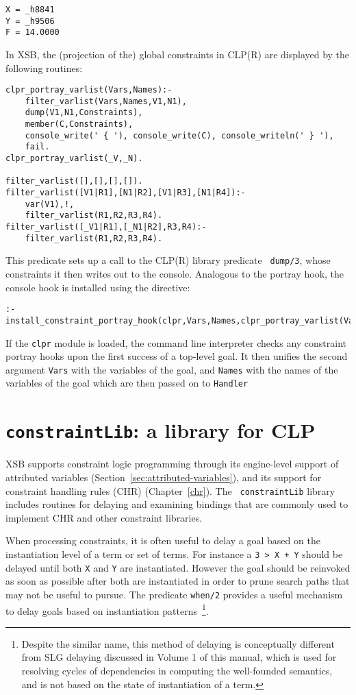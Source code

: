\begin{description}
{\begin{verbatim}
X = _h8841
Y = _h9506
F = 14.0000
\end{verbatim}
}
%
In XSB, the (projection of the) global constraints in CLP(R) are
displayed by the following routines:
%
{\small
\begin{verbatim}
clpr_portray_varlist(Vars,Names):- 
	filter_varlist(Vars,Names,V1,N1),
	dump(V1,N1,Constraints),
	member(C,Constraints),
	console_write(' { '), console_write(C),	console_writeln(' } '),
	fail.
clpr_portray_varlist(_V,_N).

filter_varlist([],[],[],[]).
filter_varlist([V1|R1],[N1|R2],[V1|R3],[N1|R4]):- 
	var(V1),!,
	filter_varlist(R1,R2,R3,R4).
filter_varlist([_V1|R1],[_N1|R2],R3,R4):- 
	filter_varlist(R1,R2,R3,R4).
\end{verbatim}
}
%
This predicate sets up a call to the CLP(R) library predicate {\tt
  dump/3}, whose constraints it then writes out to the console.
Analogous to the portray hook, the console hook is installed using the
directive:
%
{\small
\begin{verbatim}
:- install_constraint_portray_hook(clpr,Vars,Names,clpr_portray_varlist(Vars,Names)).
\end{verbatim}
}
%
If the {\tt clpr} module is loaded, the command line interpreter
checks any constraint portray hooks upon the first success of a
top-level goal.  It then unifies the second argument {\tt Vars} with
the variables of the goal, and {\tt Names} with the names of the
variables of the goal which are then passed on to {\tt Handler}

\end{description}

\section{{\tt constraintLib}: a library for CLP} \label{constraintLib}

XSB supports constraint logic programming through its engine-level
support of attributed variables
(Section~\ref{sec:attributed-variables}), and its support for
constraint handling rules (CHR) (Chapter~\ref{chr}).  The {\tt
constraintLib} library includes routines for delaying and examining
bindings that are commonly used to implement CHR and other constraint
libraries.

When processing constraints, it is often useful to delay a goal based
on the instantiation level of a term or set of terms.  For instance a
{\tt 3 > X + Y} should be delayed until both {\tt X} and {\tt Y} are
instantiated.  However the goal should be reinvoked as soon as
possible after both are instantiated in order to prune search paths
that may not be useful to pursue.  The predicate {\tt when/2} provides
a useful mechanism to delay goals based on instantiation
patterns~\footnote{Despite the similar name, this method of delaying
is conceptually different from SLG {\sc delaying} discussed in Volume
1 of this manual, which is used for resolving cycles of dependencies
in computing the well-founded semantics, and is not based on the state
of instantiation of a term.}.

